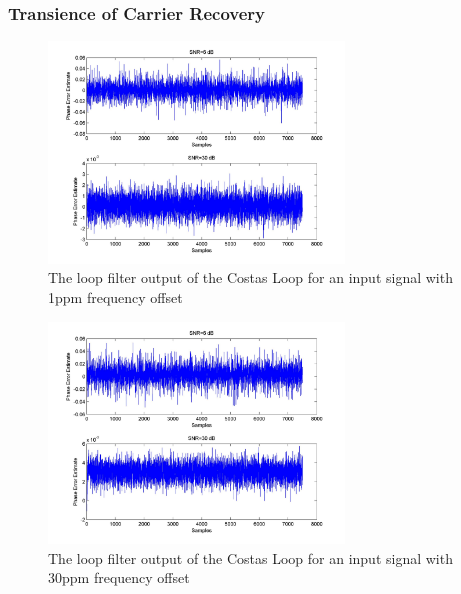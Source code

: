 \documentclass[]{article}
\begin{document}
\subsubsection{Transience of Carrier Recovery}
\begin{figure}[H]
\centering
\hspace*{-2cm}\includegraphics[width=0.7\textwidth]{qpLoopFilterfo_costas1.jpg}
\caption{The loop filter output of the Costas Loop for an input signal with 1ppm frequency offset \label{fig:costasTransFreq1}}
\end{figure}

\begin{figure}[H]
\centering
\hspace*{-2cm}\includegraphics[width=0.7\textwidth]{qpLoopFilterfo_costas2.jpg}
\caption{The loop filter output of the Costas Loop for an input signal with 30ppm frequency offset \label{fig:costasTransFreq2}}
\end{figure}
\end{document}
